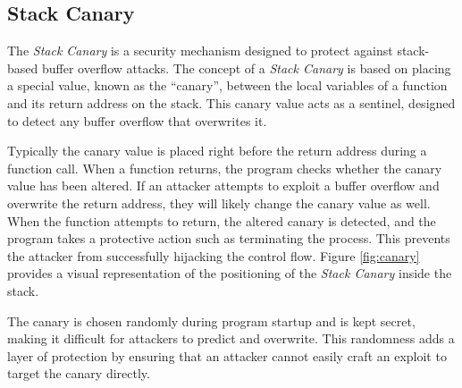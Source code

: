 \subsection{Stack Canary}
\label{subsec:background_canaries}

The \textit{Stack Canary} is a security mechanism designed to protect against stack-based
buffer overflow attacks. The concept of a \textit{Stack Canary} is based on placing
a special value, known as the ``canary'', between the local variables of a function
and its return address on the stack. This canary value acts as a sentinel, designed
to detect any buffer overflow that overwrites it.

Typically the canary value is placed right before the return address during a function
call. When a function returns, the program checks whether the canary value has been
altered. If an attacker attempts to exploit a buffer overflow and overwrite the
return address, they will likely change the canary value as well. When the
function attempts to return, the altered canary is detected, and the program
takes a protective action such as terminating the process. This prevents the attacker
from successfully hijacking the control flow. Figure \ref{fig:canary} provides a
visual representation of the positioning of the \textit{Stack Canary} inside the
stack.

The canary is chosen randomly during program startup and is kept secret, making
it difficult for attackers to predict and overwrite. This randomness adds a layer
of protection by ensuring that an attacker cannot easily craft an exploit to target
the canary directly.

